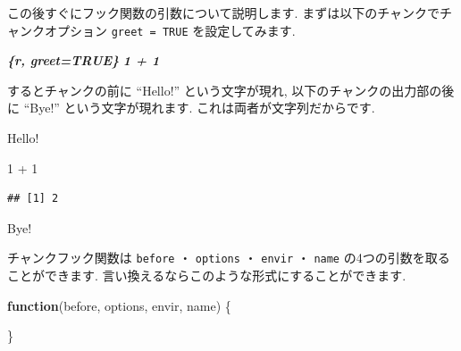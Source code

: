 \documentclass[
  11pt,
  lualatex,ja=standard,jafont=noto]{bxjsreport}
\newenvironment{Shaded}{\begin{snugshade}}{\end{snugshade}}
\newcommand{\AttributeTok}[1]{\textcolor[rgb]{0.77,0.63,0.00}{#1}}
\newcommand{\ControlFlowTok}[1]{\textcolor[rgb]{0.13,0.29,0.53}{\textbf{#1}}}
\newcommand{\DecValTok}[1]{\textcolor[rgb]{0.00,0.00,0.81}{#1}}
\newcommand{\FunctionTok}[1]{\textcolor[rgb]{0.00,0.00,0.00}{#1}}
\newcommand{\InformationTok}[1]{\textcolor[rgb]{0.56,0.35,0.01}{\textbf{\textit{#1}}}}
\newcommand{\NormalTok}[1]{#1}
\newcommand{\SpecialCharTok}[1]{\textcolor[rgb]{0.00,0.00,0.00}{#1}}
\newcommand{\StringTok}[1]{\textcolor[rgb]{0.31,0.60,0.02}{#1}}
\renewenvironment{quote}{\def\FrameCommand{{\color{quotebarcolor}{\vrule width 3pt}}\hspace{10pt}}\MakeFramed{\advance\hsize-\width\FrameRestore}}{\endMakeFramed}
\begin{document}
\begin{Shaded}
\end{Shaded}

この後すぐにフック関数の引数について説明します. まずは以下のチャンクでチャンクオプション \texttt{greet = TRUE} を設定してみます.

\begin{Shaded}
\begin{Highlighting}[]
\InformationTok{\textasciigrave{}\textasciigrave{}\textasciigrave{}\{r, greet=TRUE\}}
\InformationTok{1 + 1}
\InformationTok{\textasciigrave{}\textasciigrave{}\textasciigrave{}}
\end{Highlighting}
\end{Shaded}

するとチャンクの前に ``Hello!'' という文字が現れ, 以下のチャンクの出力部の後に ``Bye!'' という文字が現れます. これは両者が文字列だからです.

\begin{quote}
Hello!

\begin{Shaded}
\begin{Highlighting}[numbers=left,,]
\DecValTok{1} \SpecialCharTok{+} \DecValTok{1}
\end{Highlighting}
\end{Shaded}

\begin{verbatim}
## [1] 2
\end{verbatim}

Bye!
\end{quote}

チャンクフック関数は \texttt{before} ・ \texttt{options} ・ \texttt{envir} ・ \texttt{name} の4つの引数を取ることができます. 言い換えるならこのような形式にすることができます.

\begin{Shaded}
\begin{Highlighting}[]
\ControlFlowTok{function}\NormalTok{(before, options, envir, name) \{}

\NormalTok{\}}
\end{Highlighting}
\end{Shaded}
\end{document}
